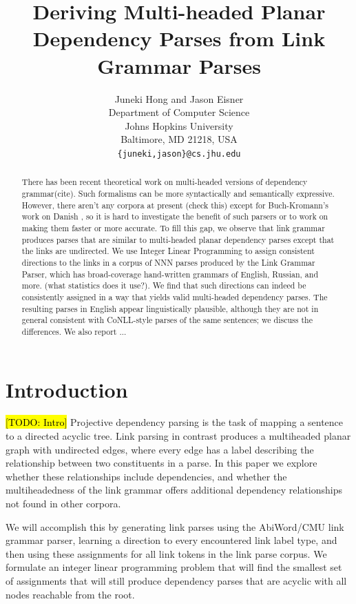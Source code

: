 \documentclass[11pt]{article}
\title{Deriving Multi-headed Planar Dependency Parses from Link Grammar Parses}
\author{Juneki Hong and Jason Eisner\\
  Department of Computer Science \\
  Johns Hopkins University \\
  Baltimore, MD 21218, USA \\ 
  {\tt \{juneki,jason\}@cs.jhu.edu} \\
}
\date{}
\newcommand{\Note}[1]{}
\renewcommand{\Note}[1]{\hl{[#1]}}  %
\newcommand{\TODO}[1]{\Note{TODO: #1}}
\begin{document}
\maketitle

\begin{abstract}
There has been recent theoretical work on multi-headed versions of dependency grammar(cite). Such formalisms can be more syntactically and semantically expressive. However, there aren't any corpora at present (check this) except for Buch-Kromann's work on Danish \cite{kromann2003danish}, so it is hard to investigate the benefit of such parsers or to work on making them faster or more accurate. To fill this gap, we observe that link grammar produces parses that are similar to multi-headed planar dependency parses except that the links are undirected. We use Integer Linear Programming to assign consistent directions to the links in a corpus of NNN parses produced by the Link Grammar Parser, which has broad-coverage hand-written grammars of English, Russian, and more. (what statistics does it use?). We find that such directions can indeed be consistently assigned in a way that yields valid multi-headed dependency parses. The resulting parses in English appear linguistically plausible, although they are not in general consistent with CoNLL-style parses of the same sentences; we discuss the differences. We also report ...
\end{abstract}


\section{Introduction}
\TODO{Intro}
Projective dependency parsing is the task of mapping a sentence to a directed acyclic tree. Link parsing in contrast produces a multiheaded planar graph with undirected edges, where every edge has a label describing the relationship between two constituents in a parse. In this paper we explore whether these relationships include dependencies, and whether the multiheadedness of the link grammar offers additional dependency relationships not found in other corpora.

We will accomplish this by generating link parses using the AbiWord/CMU link grammar parser, learning a direction to every encountered link label type, and then using these assignments for all link tokens in the link parse corpus. We formulate an integer linear programming problem that will find the smallest set of assignments that will still produce dependency parses that are acyclic with all nodes reachable from the root.
\end{document}
